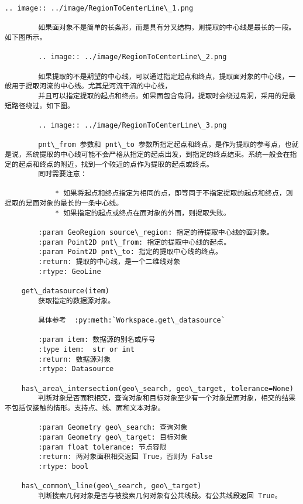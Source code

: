 \documentclass[11pt]{article}
\begin{document}
\begin{Verbatim}[commandchars=\\\{\}]
        .. image:: ../image/RegionToCenterLine\_1.png
        
        如果面对象不是简单的长条形，而是具有分叉结构，则提取的中心线是最长的一段。如下图所示。
        
        .. image:: ../image/RegionToCenterLine\_2.png
        
        如果提取的不是期望的中心线，可以通过指定起点和终点，提取面对象的中心线，一般用于提取河流的中心线。尤其是河流干流的中心线，
        并且可以指定提取的起点和终点。如果面包含岛洞，提取时会绕过岛洞，采用的是最短路径绕过。如下图。
        
        .. image:: ../image/RegionToCenterLine\_3.png
        
        pnt\_from 参数和 pnt\_to 参数所指定起点和终点，是作为提取的参考点，也就是说，系统提取的中心线可能不会严格从指定的起点出发，到指定的终点结束。系统一般会在指定的起点和终点的附近，找到一个较近的点作为提取的起点或终点。
        同时需要注意：
        
            * 如果将起点和终点指定为相同的点，即等同于不指定提取的起点和终点，则提取的是面对象的最长的一条中心线。
            * 如果指定的起点或终点在面对象的外面，则提取失败。
        
        :param GeoRegion source\_region: 指定的待提取中心线的面对象。
        :param Point2D pnt\_from: 指定的提取中心线的起点。
        :param Point2D pnt\_to: 指定的提取中心线的终点。
        :return: 提取的中心线，是一个二维线对象
        :rtype: GeoLine
    
    get\_datasource(item)
        获取指定的数据源对象。
        
        具体参考  :py:meth:`Workspace.get\_datasource`
        
        :param item: 数据源的别名或序号
        :type item:  str or int
        :return: 数据源对象
        :rtype: Datasource
    
    has\_area\_intersection(geo\_search, geo\_target, tolerance=None)
        判断对象是否面积相交，查询对象和目标对象至少有一个对象是面对象，相交的结果不包括仅接触的情形。支持点、线、面和文本对象。
        
        :param Geometry geo\_search: 查询对象
        :param Geometry geo\_target: 目标对象
        :param float tolerance: 节点容限
        :return: 两对象面积相交返回 True，否则为 False
        :rtype: bool
    
    has\_common\_line(geo\_search, geo\_target)
        判断搜索几何对象是否与被搜索几何对象有公共线段。有公共线段返回 True。
        

\end{Verbatim}
\end{document}
